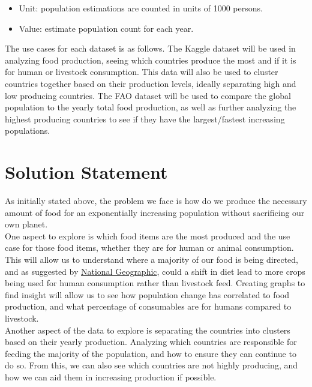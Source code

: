 \documentclass[12pt, a4paper]{article}
\begin{document}
\begin{spacing}{1.1}
\begin{itemize}
		\item Unit: population estimations are counted in units of 1000 persons.
		\item Value: estimate population count for each year.
	\end{itemize}\vspace*{2mm}
	The use cases for each dataset is as follows. The Kaggle dataset will be used in analyzing food production, seeing which countries produce the most and if it is for human or livestock consumption. This data will also be used to cluster countries together based on their production levels, ideally separating high and low producing countries. The FAO dataset will be used to compare the global population to the yearly total food production, as well as further analyzing the highest producing countries to see if they have the largest/fastest increasing populations. \newpage
	
	
	\section{Solution Statement}
	As initially stated above, the problem we face is how do we produce the necessary amount of food for an exponentially increasing population without sacrificing our own planet. \vspace*{2mm}\\	
	One aspect to explore is which food items are the most produced and the use case for those food items, whether they are for human or animal consumption. This will allow us to understand where a majority of our food is being directed, and as suggested by \href{https://www.nationalgeographic.com/foodfeatures/feeding-9-billion/}{National Geographic}, could a shift in diet lead to more crops being used for human consumption rather than livestock feed. Creating graphs to find insight will allow us to see how population change has correlated to food production, and what percentage of consumables are for humans compared to livestock. \vspace*{2mm}\\	
	Another aspect of the data to explore is separating the countries into clusters based on their yearly production. Analyzing which countries are responsible for feeding the majority of the population, and how to ensure they can continue to do so. From this, we can also see which countries are not highly producing, and how we can aid them in increasing production if possible.
	

\end{spacing}
\end{document}
